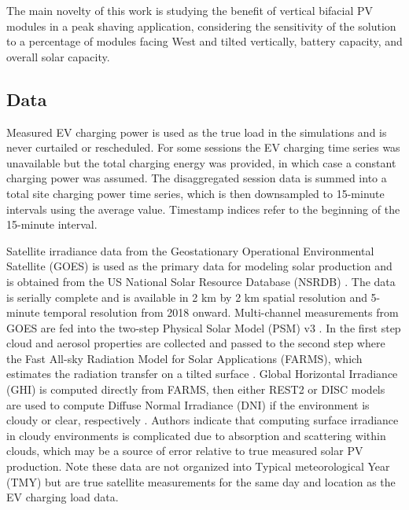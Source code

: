 \documentclass[journal,article,submit,pdftex,moreauthors]{Definitions/mdpi}
\begin{document}
  The main novelty of this work is studying the benefit of vertical bifacial PV modules in a peak shaving application, considering the sensitivity of the solution to a percentage of modules facing West and tilted vertically, battery capacity, and overall solar capacity.


  \subsection{Data}\label{data}%


  Measured EV charging power is used as the true load in the simulations and is never curtailed or rescheduled. For some sessions the EV charging time series was unavailable but the total charging energy was provided, in which case a constant charging power was assumed. The disaggregated session data is summed into a total site charging power time series, which is then downsampled to 15-minute intervals using the average value. Timestamp indices refer to the beginning of the 15-minute interval.



  Satellite irradiance data from the Geostationary Operational Environmental Satellite (GOES) is used as the primary data for modeling solar production and is obtained from the US National Solar Resource Database (NSRDB) \cite{Sengupta2018}. The data is serially complete and is available in 2 km by 2 km spatial resolution and 5-minute temporal resolution from 2018 onward. Multi-channel measurements from GOES are fed into the two-step Physical Solar Model (PSM) v3  \cite{Sengupta2018}. In the first step cloud and aerosol properties are collected and passed to the second step where the Fast All-sky Radiation Model for Solar Applications (FARMS), which estimates the radiation transfer on a tilted surface \cite{Xie2016}. Global Horizontal Irradiance (GHI) is computed directly from FARMS, then either REST2 or DISC models are used to compute Diffuse Normal Irradiance (DNI) if the environment is cloudy or clear, respectively \cite{Xie2018}. Authors indicate that computing surface irradiance in cloudy environments is complicated due to absorption and scattering within clouds, which may be a source of error relative to true measured solar PV production. Note these data are not organized into Typical meteorological Year (TMY) but are true satellite measurements for the same day and location as the EV charging load data.
\end{document}
